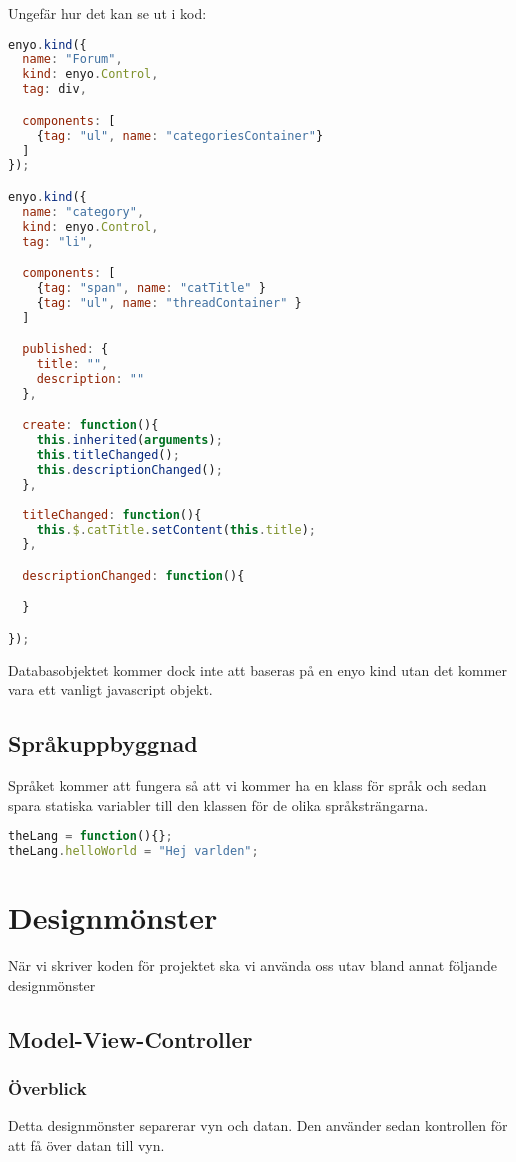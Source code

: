 \documentclass[a4paper, 12pt, titlepage]{article}
\begin{document}
          Ungefär hur det kan se ut i kod:
          \begin{lstlisting}[language=JavaScript]
enyo.kind({
  name: "Forum",
  kind: enyo.Control,
  tag: div,

  components: [
    {tag: "ul", name: "categoriesContainer"}
  ]
});

enyo.kind({
  name: "category",
  kind: enyo.Control,
  tag: "li",

  components: [
    {tag: "span", name: "catTitle" }
    {tag: "ul", name: "threadContainer" }
  ]

  published: {
    title: "",
    description: ""
  },

  create: function(){
    this.inherited(arguments);
    this.titleChanged();
    this.descriptionChanged();
  },
  
  titleChanged: function(){
    this.$.catTitle.setContent(this.title);
  },

  descriptionChanged: function(){

  }

});
          \end{lstlisting}
          Databasobjektet kommer dock inte att baseras på en enyo kind utan det kommer vara ett vanligt javascript objekt.

        \subsection{Språkuppbyggnad}
          Språket kommer att fungera så att vi kommer ha en klass för språk och sedan spara statiska variabler till den klassen för de olika språksträngarna.
\begin{lstlisting}[language=JavaScript]
theLang = function(){};
theLang.helloWorld = "Hej varlden";
\end{lstlisting}


    \section{Designmönster}
        När vi skriver koden för projektet ska vi använda oss utav bland annat följande designmönster
        \subsection{Model-View-Controller}
        
        \subsubsection{Överblick}
            Detta designmönster separerar vyn och datan. Den använder sedan kontrollen för att få över datan till vyn.
        
\end{document}
